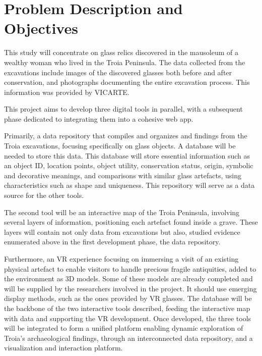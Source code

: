 \section{Problem Description and Objectives}
\label{sec:problem_description_and_objectives} 
This study will concentrate on glass relics discovered in the mausoleum of a wealthy woman who lived in the Troia Peninsula. The data collected from the excavations include 
images of the discovered glasses both before and after conservation, and photographs documenting the entire excavation process. 
This information was provided by \gls{VICARTE}.

This project aims to develop three digital tools in parallel, with a subsequent phase dedicated to 
integrating them into a cohesive web app.


Primarily, a data repository that compiles and organizes and findings from 
the Troia excavations, focusing specifically on glass objects. A database will be needed to store this data. 
This database will store essential information such as an object ID, location points, object utility,
conservation status, origin, symbolic and decorative meanings, and comparisons with similar glass artefacts, using characteristics such as shape and uniqueness. 
This repository will serve as a data source for the other tools.


The second tool will be an interactive map of the Troia Peninsula, involving several layers of information, positioning each 
artefact found inside a grave. These layers will contain not only data from excavations but also, 
studied evidence enumerated above in the first development phase, the data repository.
 
Furthermore, an \gls{VR} experience focusing on immersing a visit of an existing physical 
artefact to enable visitors to handle precious fragile antiquities, added to the environment as \gls{3D} models. Some of these models are already completed and will be supplied by the researchers involved in the project.
It should use emerging display methods, such as the ones provided by \gls{VR} glasses.
The database will be the backbone of the two interactive tools described, feeding the interactive map with data and supporting the \gls{VR} development.
Once developed, the three tools will be integrated to form a unified platform enabling dynamic exploration of Troia's archaeological findings,
through an interconnected data repository, and a visualization and interaction platform.

